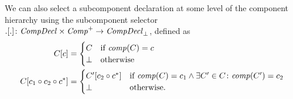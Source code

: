 \documentclass[a4paper,10pt,english]{article}
\begin{document}
We can also select a subcomponent declaration at some level of the component hierarchy using the subcomponent selector $.[.]
\colon \mathit{CompDecl} \times \mathit{Comp}^+ \rightarrow \mathit{CompDecl}_\bot$, defined as
\begin{align*}
	C[c] &= \begin{cases}
		C & \text{if } \mathit{comp}(C) = c \\
		\bot & \text{otherwise}
	\end{cases} \\
	C[c_1 \circ c_2 \circ c^*] &= 
		\begin{cases}
			C'[c_2 \circ c^*] & \text{if } 
				\mathit{comp}(C) = c_1 \wedge \exists C' \in C \colon \mathit{comp}(C') = c_2 \\
			\bot & \text{otherwise.}
		\end{cases}
\end{align*}
\end{document}
